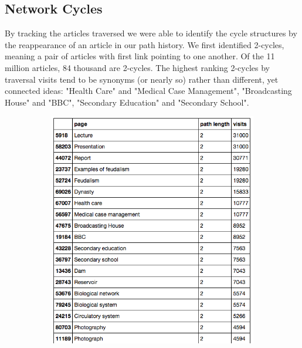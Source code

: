 \documentclass[twoside]{article}
\newcommand{\red}[1]{{\leavevmode\color{sred}{#1}}} %
\begin{document}
\subsection{Network Cycles}
By tracking the articles traversed we were able to identify the cycle structures
by the reappearance of an article in our path history.
We first identified 2-cycles, meaning a pair of articles with first link pointing to one another.
Of the 11 million articles, 84 thousand are 2-cycles. 
The highest ranking 2-cycles by traversal visits tend to be synonyms (or nearly so) rather than different, yet connected ideas:
"Health Care" and "Medical Case Management", "Broadcasting House" and "BBC", "Secondary Education" and "Secondary School".

\begin{figure}[H]
\centering
\caption{highest ranking 2-Cycles}
    \begin{subfigure}[b]{0.8\textwidth}
        \includegraphics[width=\textwidth]{graphics/top_2loops.png}
    \end{subfigure}
\end{figure}

\red{[[better representation to come\\
look into articles that don't seem to have a partner]]}
\end{document}

